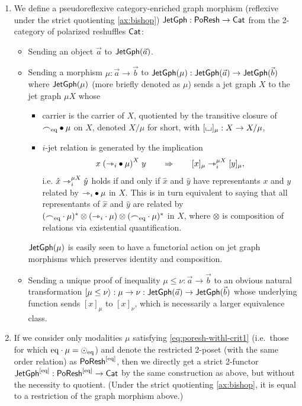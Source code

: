 \documentclass[a4paper]{memoir}
\begin{document}
\begin{definition}
	\label{def:poresh-jetgph}
	\begin{enumerate}
		\item We define a pseudoreflexive category-enriched graph morphism (reflexive under the strict quotienting \cref{ax:bishop}) $\mathsf{JetGph} : \mathsf{PoResh} \to {\mathsf{Cat}}$ from the 2-category of polarized reshuffles ${\mathsf{Cat}}$:
		\begin{itemize}
			\item Sending an object $\vec a$ to $\mathsf{JetGph}(\vec a)$.
			\item Sending a morphism $\mu : \vec a \to \vec b$ to $\mathsf{JetGph}(\mu) : \mathsf{JetGph}(\vec a) \to \mathsf{JetGph}(\vec b)$ where $\mathsf{JetGph}(\mu)$ (more briefly denoted as $\mu$) sends a jet graph $X$ to the jet graph $\mu X$ whose
			\begin{itemize}
				\item carrier is the carrier of $X$, quotiented by the transitive closure of ${\frown}_{{\mathrm{eq}}} \mathbin{\bullet} \mu$ on $X$, denoted $X/\mu$ for short, with $[{\llcorner\hspace{-.4ex}\lrcorner}]_\mu : X \to X/\mu$,
				\item $i$-jet relation is generated by the implication
				\[
					x \mathrel{({\rightarrowtriangle}_i \mathbin{\bullet} \mu)}^X y \qquad \Rightarrow \qquad [x]_\mu \rightarrowtriangle_i^{\mu X} [y]_\mu,
				\]
				i.e. $\hat x \rightarrowtriangle_i^{\mu X} \hat y$ holds if and only if $\hat x$ and $\hat y$ have representants $x$ and $y$ related by ${\rightarrowtriangle}_i \mathbin{\bullet} \mu$ in $X$.
				This is in turn equivalent to saying that all representants of $\hat x$ and $\hat y$ are related by $({\frown}_{{\mathrm{eq}}} \cdot \mu)^* \otimes ({\rightarrowtriangle}_i \cdot \mu) \otimes ({\frown}_{{\mathrm{eq}}} \cdot \mu)^*$ in $X$, where $\otimes$ is composition of relations via existential quantification.
			\end{itemize}
			$\mathsf{JetGph}(\mu)$ is easily seen to have a functorial action on jet graph morphisms which preserves identity and composition.
			\item Sending a unique proof of inequality $\mu \leq \nu : \vec a \to \vec b$ to an obvious natural transformation $\mathopen{}\left[ \mu \leq \nu \right\rangle\mathclose{} : \mu \to \nu : \mathsf{JetGph}(\vec a) \to \mathsf{JetGph}(\vec b)$ whose underlying function sends $[x]_\mu$ to $[x]_\nu$, which is necessarily a larger equivalence class.
		\end{itemize}
		
		\item If we consider only modalities $\mu$ satisfying \cref{eq:poresh-withl-crit1} (i.e.\ those for which ${\mathrm{eq}} \cdot \mu = {\odot}_{\mathrm{eq}}$) and denote the restricted 2-poset (with the same order relation) as $\mathsf{PoResh} ^{[{\mathrm{eq}}]}$, then we directly get a strict 2-functor $\mathsf{JetGph} ^{[{\mathrm{eq}}]} : \mathsf{PoResh} ^{[{\mathrm{eq}}]} \to {\mathsf{Cat}}$ by the same construction as above, but without the necessity to quotient. (Under the strict quotienting \cref{ax:bishop}, it is equal to a restriction of the graph morphism above.)
	\end{enumerate}
\end{definition}
\end{document}
